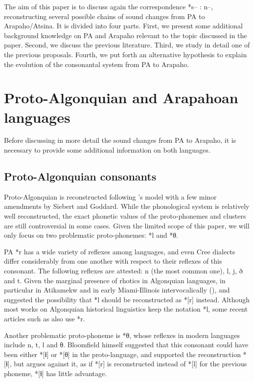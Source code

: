 \documentclass[oldfontcommands,oneside,a4paper,11pt]{article}
\newcommand{\ipa}[1]{{\phon #1}} %
\begin{document}
The aim of this paper is to discuss again the correspondence *s-- : n--, reconstructing several possible chains of sound changes   from PA to Arapaho/Atsina.  It is divided into four parts. First, we present some additional background knowledge on PA and Arapaho relevant to the topic discussed in the paper. Second, we discuss the previous literature. Third, we study in detail one of the previous proposals. Fourth, we put forth an alternative hypothesis to explain the evolution of the consonantal system from PA to Arapaho.

\section{Proto-Algonquian and Arapahoan languages}
Before discussing in more detail the sound changes from PA to Arapaho, it is necessary to provide some additional information on both languages.

\subsection{Proto-Algonquian consonants}
Proto-Algonquian is reconstructed following \citet{bloomfield46proto}'s model with a few minor amendments by Siebert and Goddard. While the phonological system is relatively well reconstructed,   the exact phonetic values of the proto-phonemes and clusters are still controversial in some cases. Given the limited scope of this paper, we will only focus on two problematic proto-phonemes: *l and *θ. 

PA *r has a wide variety of reflexes among languages, and even Cree dialects differ considerably  from one another with respect to their reflexes of this consonant. The following reflexes are attested: \ipa{n} (the most common one), \ipa{l}, \ipa{j}, \ipa{ð} and \ipa{t}. Given the marginal presence of rhotics in Algonquian languages, in particular in Atikamekw and in early Miami-Illinois intervocalically (\citealt[41]{costa03miami}), \citet{goddard79comparative} and \citet{goddard94cline} suggested the possibility that *l should be reconstructed as *[r] instead.  Although most works on Algonquian historical linguistics keep the notation *l, some recent articles such as \citet{goddard98arapaho} also use *r.

Another problematic proto-phoneme is *θ, whose reflexes in modern languages include \ipa{n}, \ipa{t}, \ipa{l} and \ipa{θ}. Bloomfield himself suggested that this consonant could have been either *[ɬ] or *[θ] in the proto-language, and \citet{picard84lh} supported the reconstruction *[ɬ], but \citet{goddard94cline} argues against it, as if *[r] is reconstructed instead of  *[l] for the previous phoneme, *[ɬ] has little advantage.
\end{document}
